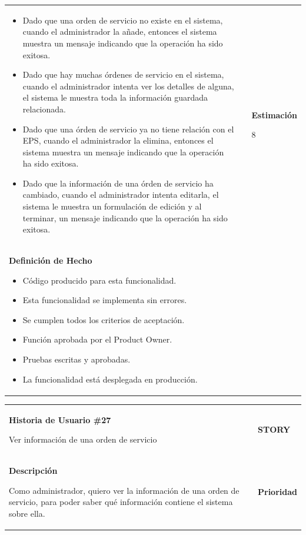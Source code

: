 \documentclass[12pt,a4paper]{article}
\begin{document}
\begin{center}
\begin{tabular}{|>{\columncolor[RGB]{215, 215, 215}} p{10cm} >{\columncolor[RGB]{215, 215, 215}} c >{\columncolor[RGB]{215, 215, 215}} p{2.5cm}|}
\begin{itemize}
\item Dado que una orden de servicio no existe en el sistema, cuando el
administrador la añade, entonces el sistema muestra un mensaje
indicando que la operación ha sido exitosa.
\item Dado que hay muchas órdenes de servicio en el sistema, cuando el
administrador intenta ver los detalles de alguna, el sistema le
muestra toda la información guardada relacionada.
\item Dado que una órden de servicio ya no tiene relación con el EPS, cuando el
administrador la elimina, entonces el sistema muestra un
mensaje indicando que la operación ha sido exitosa.
\item Dado que la información de una órden de servicio ha cambiado, cuando
el administrador intenta editarla, el sistema le muestra un
formulación de edición y al terminar, un mensaje indicando que
la operación ha sido exitosa.
\end{itemize} & & \textbf{Estimación}

8 \\ 

\textbf{Definición de Hecho}

\begin{itemize}
\item Código producido para esta funcionalidad.
\item Esta funcionalidad se implementa sin errores.
\item Se cumplen todos los criterios de aceptación.
\item Función aprobada por el Product Owner.
\item Pruebas escritas y aprobadas.
\item La funcionalidad está desplegada en producción.
\end{itemize} & & \\
\hline  
\end{tabular}
\vspace{5mm}

\begin{tabular}{| p{10cm} c p{2.5cm}|}
\hline 
\textbf{Historia de Usuario \#27}

Ver información de una orden de servicio & & \textbf{{\Large STORY}} \\ 
\textbf{Descripción}

Como administrador, quiero ver la información de una orden de servicio, para
poder saber qué información contiene el sistema sobre ella. &  & \textbf{Prioridad}


\end{tabular}
\end{center}
\end{document}
